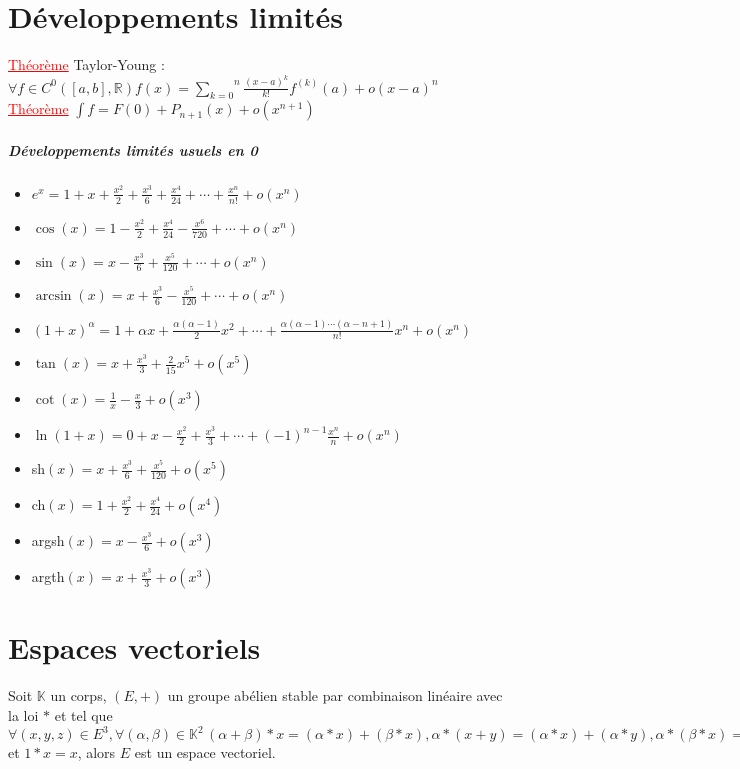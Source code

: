 \documentclass[a4paper, 11pts, french]{article}
\newcommand{\R}{\mathbb{R}}
\newcommand{\K}{\mathbb{K}}
\newcommand{\al}{\alpha}
\newcommand{\be}{\beta}
\newcommand{\som}[2]{\overset{#2}{\underset{#1}{\sum}}}
\newcommand{\thm}{\textcolor{red}{\underline{Théorème} }}
\newcommand{\inv}[1]{\frac{1}{#1}}
\begin{document}
	\section{Développements limités}
	 \thm Taylor-Young : $\forall f \in C^0([a,b],\R) f(x)=\som{k=0}{n}\frac{(x-a)^k}{k!}f^{(k)}(a)+o(x-a)^n$ \\
	 \thm $\int f=F(0)+P_{n+1}(x)+o(x^{n+1})$
	\subparagraph{Développements limités usuels en 0}
	\begin{itemize}
	  \item $e^x=1+x+\frac{x^2}{2}+\frac{x^3}{6}+\frac{x^4}{24}+\cdots+\frac{x^n}{n!}+o(x^n)$
	  \item $\cos(x)=1-\frac{x^2}{2}+\frac{x^4}{24}-\frac{x^6}{720}+\cdots+o(x^n)$
	  \item $\sin(x)=x-\frac{x^3}{6}+\frac{x^5}{120}+\cdots+o(x^n)$
	  \item $\arcsin(x)=x+\frac{x^3}{6}-\frac{x^5}{120}+\cdots+o(x^n)$
	  \item $(1+x)^\al=1+\al x+\frac{\al(\al-1)}{2}x^2+\cdots+ \frac{\al(\al-1)\cdots(\al-n+1)}{n!}x^n+o(x^n)$
	  \item $\tan(x)=x+\frac{x^3}{3}+\frac{2}{15}x^5+o(x^5)$
	  \item $\cot(x)=\inv{x}-\frac{x}{3}+o(x^3)$
	  \item $\ln(1+x)=0+x-\frac{x^2}{2}+\frac{x^3}{3}+\cdots+(-1)^{n-1}\frac{x^{n}}{n}+o(x^n)$
	  \item sh$(x)=x+\frac{x^3}{6}+\frac{x^5}{120}+o(x^5)$
	  \item ch$(x)=1+\frac{x^2}{2}+\frac{x^4}{24}+o(x^4)$
	  \item argsh$(x)=x-\frac{x^3}{6}+o(x^3)$
	  \item argth$(x)=x+\frac{x^3}{3}+o(x^3)$
	\end{itemize}

	\section{Espaces vectoriels}
	Soit $\K$ un corps, $(E,+)$ un groupe abélien stable par combinaison linéaire avec la loi $*$ et tel que $\forall (x,y,z)\in E^3,\forall (\al,\be) \in \K^2 \, (\al+\be)*x=(\al*x)+(\be*x), \al*(x+y)=(\al*x)+(\al*y), \al*(\be*x)=(\al  \be)*x$ et $1*x=x$, alors $E$ est un espace vectoriel.
\end{document}
